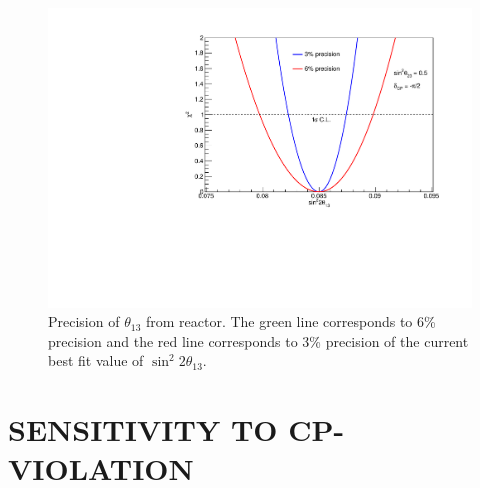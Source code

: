 \documentclass[a4 paper,12pt]{report}%
\def\Mr{\uppercase}
\begin{document}
     \begin{figure}
 	\centering
 	\includegraphics[scale=0.5]{theta13_precision} 
 	\caption{\label{theta13} Precision of $\theta_{13}$  from reactor. The green line corresponds to 6\% precision and the red line corresponds to 3\% precision of the current best fit value of $\sin^{2}2\theta_{13}$.} 
 \end{figure}

\section{\Mr{Sensitivity to CP-violation}}\label{sec:results}
\end{document}

